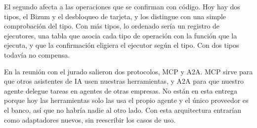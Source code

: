El segundo afecta a las operaciones que se confirman con código. Hoy hay dos tipos, el Bizum y el desbloqueo de
tarjeta, y  los distingue con una simple comprobación del tipo. Con más tipos, lo ordenado
sería un registro de ejecutores, una tabla que asocia cada tipo de operación con la función que la ejecuta, y que la
confirmación eligiera el ejecutor según el tipo. Con dos tipos todavía no compensa.

En la reunión con el jurado salieron dos protocolos, MCP y A2A. MCP sirve para que otros asistentes de IA usen
nuestras herramientas, y A2A para que nuestro agente delegue tareas en agentes de otras empresas. No están en esta
entrega porque hoy las herramientas solo las usa el propio agente y el único proveedor es el banco, así que no habría
nadie al otro lado. Con esta arquitectura entrarían como adaptadores nuevos, sin reescribir los casos de uso.

